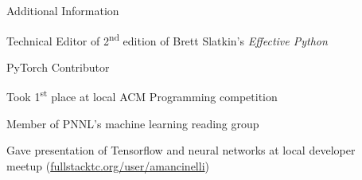 \documentclass{resume} %
\begin{document}

\begin{rSection}{Additional Information} \itemsep -2pt
\item Technical Editor of 2\textsuperscript{nd} edition of Brett Slatkin's \textit{Effective Python}
\item PyTorch Contributor
\item Took 1\textsuperscript{st} place at local ACM Programming competition
\item Member of PNNL's machine learning reading group
\item Gave presentation of Tensorflow and neural networks at local developer \\ meetup (\url{fullstacktc.org/user/amancinelli})
\end{rSection}


% 
\end{document}
